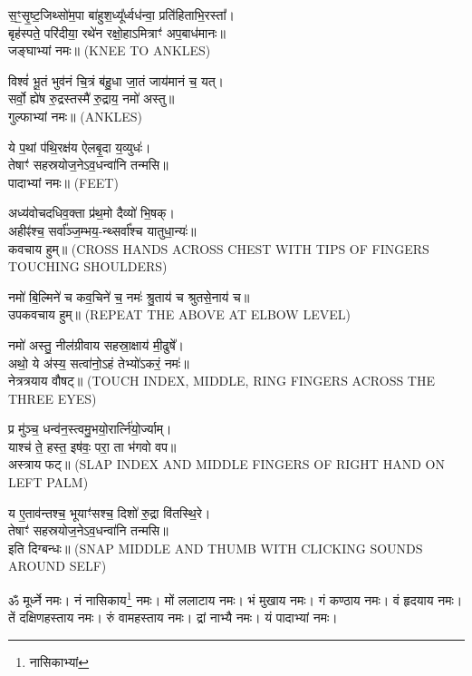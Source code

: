 स॒ꣳ॒सृ॒ष्ट॒जिथ्सो॑म॒पा बा॑हुश॒ध्यू᳚र्ध्वध॑न्वा॒ प्रति॑हिताभि॒रस्ता᳚।\\
बृह॑स्पते॒ परि॑दीया॒ रथे॑न रक्षो॒हाऽमित्राꣳ॑ अप॒बाध॑मानः॥\\
जङ्घाभ्यां नमः॥ {\scriptsize (KNEE TO ANKLES)}

विश्वं॑ भू॒तं भुव॑नं चि॒त्रं ब॑हु॒धा जा॒तं जाय॑मानं च॒ यत्।\\
सर्वो॒ ह्ये॑ष रु॒द्रस्तस्मै॑ रु॒द्राय॒ नमो॑ अस्तु॥\\
गुल्फाभ्यां नमः॥ {\scriptsize (ANKLES)}

ये प॒थां प॑थि॒रक्ष॑य ऐलबृ॒दा य॒व्युधः॑।\\
तेषाꣳ॑ सहस्रयोज॒नेऽव॒धन्वा॑नि तन्मसि॥\\
पादाभ्यां नमः॥ {\scriptsize (FEET)}

अध्य॑वोचदधिव॒क्ता प्र॑थ॒मो दैव्यो॑ भि॒षक्।\\
अहीꣴ॑श्च॒ सर्वा᳚ञ्ज॒म्भय॒-न्थ्सर्वा᳚श्च यातुधा॒न्यः॑॥\\
कवचाय हुम्॥ {\scriptsize (CROSS HANDS ACROSS CHEST WITH TIPS OF FINGERS TOUCHING SHOULDERS)}

नमो॑ बि॒ल्मिने॑ च कव॒चिने॑ च॒ नमः॑ श्रु॒ताय॑ च श्रुतसे॒नाय॑ च॥\\
उपकवचाय हुम्॥ {\scriptsize (REPEAT THE ABOVE AT ELBOW LEVEL)}

नमो॑ अस्तु॒ नील॑ग्रीवाय सहस्रा॒क्षाय॑ मी॒ढुषे᳚।\\
अथो॒ ये अ॑स्य॒ सत्वा॑नो॒ऽहं तेभ्यो॑ऽकरं॒ नमः॑॥\\
नेत्रत्रयाय वौषट्॥ {\scriptsize (TOUCH INDEX, MIDDLE, RING FINGERS ACROSS THE THREE EYES)}

प्र मु॑ञ्च॒ धन्व॑न॒स्त्वमु॒भयो॒रार्त्नि॑यो॒र्ज्याम्।\\
याश्च॑ ते॒ हस्त॒ इष॑वः॒ परा॒ ता भ॑गवो वप॥\\ 
अस्त्राय फट्॥ {\scriptsize (SLAP INDEX AND MIDDLE FINGERS OF RIGHT HAND ON LEFT PALM)}

य ए॒ताव॑न्तश्च॒ भूयाꣳ॑सश्च॒ दिशो॑ रु॒द्रा वि॑तस्थि॒रे।\\
तेषाꣳ॑ सहस्रयोज॒नेऽव॒धन्वा॑नि तन्मसि॥\\
इति दिग्बन्धः॥ {\scriptsize (SNAP MIDDLE AND THUMB WITH CLICKING SOUNDS AROUND SELF)}

{\small\closesection}

ॐ मूर्ध्ने नमः। नं नासिकाय\footnote{नासिकाभ्यां} नमः। मों ललाटाय नमः। भं मुखाय नमः। गं कण्ठाय नमः। वं हृदयाय नमः। तें दक्षिणहस्ताय नमः। रुं वामहस्ताय नमः। द्रां नाभ्यै नमः। यं पादाभ्यां नमः।

